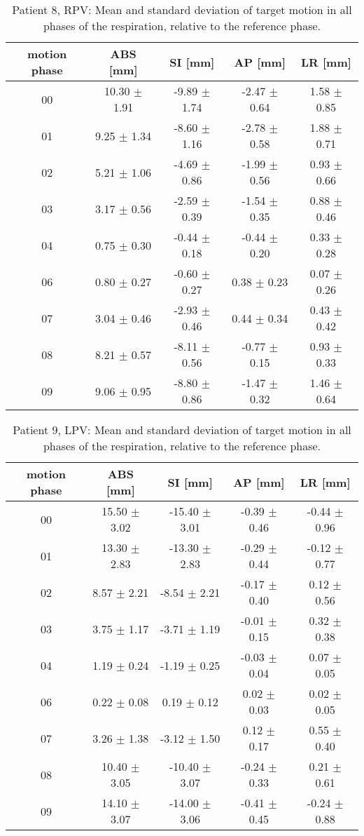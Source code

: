 \begin{table}[H]
  \centering
  \caption{Patient 8, RPV: Mean and standard deviation of target motion in all phases of the respiration, relative to the reference phase.}
  \begin{tabular}{|c|c|c|c|c|}
    \hline\hline
    motion phase & ABS [mm] & SI [mm] & AP [mm] & LR [mm]\\
    \hline 
00& 10.30 $\pm$ 1.91& -9.89 $\pm$ 1.74& -2.47 $\pm$ 0.64& 1.58 $\pm$ 0.85 \\
01& 9.25 $\pm$ 1.34& -8.60 $\pm$ 1.16& -2.78 $\pm$ 0.58& 1.88 $\pm$ 0.71 \\ 
02& 5.21 $\pm$ 1.06& -4.69 $\pm$ 0.86& -1.99 $\pm$ 0.56& 0.93 $\pm$ 0.66 \\
03& 3.17 $\pm$ 0.56& -2.59 $\pm$ 0.39& -1.54 $\pm$ 0.35& 0.88 $\pm$ 0.46 \\ 
04& 0.75 $\pm$ 0.30& -0.44 $\pm$ 0.18& -0.44 $\pm$ 0.20& 0.33 $\pm$ 0.28 \\
06& 0.80 $\pm$ 0.27& -0.60 $\pm$ 0.27& 0.38 $\pm$ 0.23& 0.07 $\pm$ 0.26 \\
07& 3.04 $\pm$ 0.46& -2.93 $\pm$ 0.46& 0.44 $\pm$ 0.34& 0.43 $\pm$ 0.42 \\
08& 8.21 $\pm$ 0.57& -8.11 $\pm$ 0.56& -0.77 $\pm$ 0.15& 0.93 $\pm$ 0.33 \\
09& 9.06 $\pm$ 0.95& -8.80 $\pm$ 0.86& -1.47 $\pm$ 0.32& 1.46 $\pm$ 0.64 \\
        \hline\hline
  \end{tabular}
\end{table}


\begin{table}[H]
  \centering
  \caption{Patient 9, LPV: Mean and standard deviation of target motion in all phases of the respiration, relative to the reference phase.}
  \begin{tabular}{|c|c|c|c|c|}
    \hline\hline
    motion phase & ABS [mm] & SI [mm] & AP [mm] & LR [mm]\\
    \hline 
00& 15.50 $\pm$ 3.02& -15.40 $\pm$ 3.01& -0.39 $\pm$ 0.46& -0.44 $\pm$ 0.96 \\
01& 13.30 $\pm$ 2.83& -13.30 $\pm$ 2.83& -0.29 $\pm$ 0.44& -0.12 $\pm$ 0.77 \\
02& 8.57 $\pm$ 2.21& -8.54 $\pm$ 2.21& -0.17 $\pm$ 0.40& 0.12 $\pm$ 0.56 \\
03& 3.75 $\pm$ 1.17& -3.71 $\pm$ 1.19& -0.01 $\pm$ 0.15& 0.32 $\pm$ 0.38 \\
04& 1.19 $\pm$ 0.24& -1.19 $\pm$ 0.25& -0.03 $\pm$ 0.04& 0.07 $\pm$ 0.05 \\
06& 0.22 $\pm$ 0.08& 0.19 $\pm$ 0.12& 0.02 $\pm$ 0.03& 0.02 $\pm$ 0.05 \\
07& 3.26 $\pm$ 1.38& -3.12 $\pm$ 1.50& 0.12 $\pm$ 0.17& 0.55 $\pm$ 0.40 \\
08& 10.40 $\pm$ 3.05& -10.40 $\pm$ 3.07& -0.24 $\pm$ 0.33& 0.21 $\pm$ 0.61 \\ 
09& 14.10 $\pm$ 3.07& -14.00 $\pm$ 3.06& -0.41 $\pm$ 0.45& -0.24 $\pm$ 0.88 \\
        \hline\hline
  \end{tabular}
\end{table}

